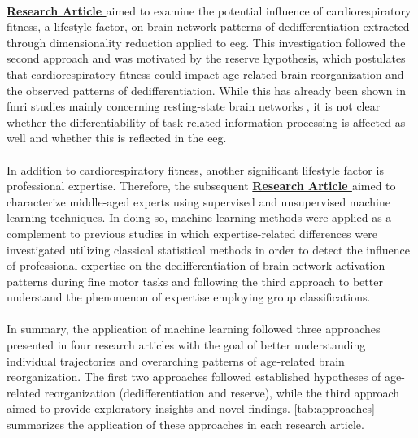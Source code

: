 \\
\textbf{\hyperref[results:paperIII]{Research Article }} aimed to examine the potential influence of cardiorespiratory fitness, a lifestyle factor, on brain network patterns of dedifferentiation extracted through dimensionality reduction applied to \gls{eeg}. This investigation followed the second approach and was motivated by the reserve hypothesis, which postulates that cardiorespiratory fitness could impact age-related brain reorganization and the observed patterns of dedifferentiation. While this has already been shown in \gls{fmri} studies mainly concerning resting-state brain networks \cite{Stillman2019}, it is not clear whether the differentiability of task-related information processing is affected as well and whether this is reflected in the \gls{eeg}.\\
\\
In addition to cardiorespiratory fitness, another significant lifestyle factor is professional expertise. Therefore, the subsequent \textbf{\hyperref[results:paperIV]{Research Article }} aimed to characterize middle-aged experts using supervised and unsupervised machine learning techniques. In doing so, machine learning methods were applied as a complement to previous studies in which expertise-related differences were investigated utilizing classical statistical methods \cite{Vieluf2018, Goelz2018} in order to detect the influence of professional expertise on the dedifferentiation of brain network activation patterns during fine motor tasks and following the third approach to better understand the phenomenon of expertise employing group classifications.\\
\\
In summary, the application of machine learning followed three approaches presented in four research articles with the goal of better understanding individual trajectories and overarching patterns of age-related brain reorganization. The first two approaches followed established hypotheses of age-related reorganization (dedifferentiation and reserve), while the third approach aimed to provide exploratory insights and novel findings. \autoref{tab:approaches} summarizes the application of these approaches in each research article.

